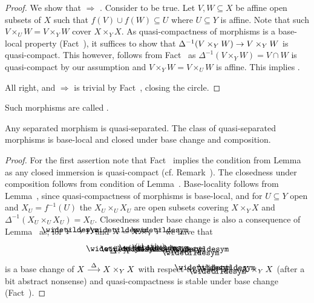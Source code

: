 \documentclass[a4paper,parskip=half,numbers=enddot, DIV=12]{scrreprt}
\begin{document}
\begin{proof}
    We show that  $\Rightarrow$ . Consider  to be true. Let $V, W\subseteq X$ be affine open subsets of $X$ such that $f(V)\cup f(W) \subseteq U$ where $U\subseteq Y$ is affine. Note that such $V\times_U W = V\times_Y W$ cover $X\times_Y X$. As quasi-compactness of morphisms is a base-local property (Fact~), it suffices to show that $\Delta^{-1}(V\times_Y W)\morphism V\times_Y W$ is quasi-compact. This however, follows from Fact~ as $\Delta^{-1}(V\times_YW) = V\cap W$ is quasi-compact by our assumption and $V\times_Y W= V\times_U W$ is affine. This implies .
    
    All right, and  $\Rightarrow$  is trivial by Fact~, closing the circle.
\end{proof}
\begin{defi}
    Such morphisms are called .
\end{defi}
\begin{fact}
    Any separated morphism is quasi-separated. The class of quasi-separated morphisms is base-local and closed under base change and composition.
\end{fact}
\begin{proof}
    For the first assertion note that Fact~ implies the condition from Lemma~ as any closed immersion is quasi-compact (cf. Remark~). The closedness under composition follows from condition  of Lemma~. Base-locality follows from Lemma~, since quasi-compactness of morphisms is base-local, and for $U\subseteq Y$ open and $X_U = f^{-1}(U)$ the $X_U\times_U X_U$ are open subsets covering $X\times_Y X$ and $\Delta^{-1}(X_U\times_U X_U) = X_U$. Closedness under base change is also a consequence of Lemma~ as, for $\snake Y\morphism Y$ and $\snake X = X\times_Y \snake Y$ we have that 
    \begin{align*}
    	\snake\Delta\colon\snake X \xrightarrow{\left(\id_{\snake X},\id_{\snake X}\right)} \snake X\times_{\snake Y}\snake X\;
    \end{align*}
    is a base change of $X\morphism[\Delta] X\times_Y X$ with respect to $\snake X\times_{\snake Y} \snake X \morphism X\times_Y X$ (after a bit abstract nonsense) and quasi-compactness is stable under base change (Fact~).
\end{proof}
\end{document}
